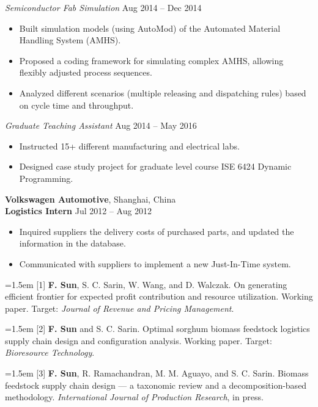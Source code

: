 \documentclass[11pt,letterpaper]{article}
\newcommand{\mhead}[1]{\leavevmode\marginpar{\small\sffamily #1}}
\begin{document}
\smallskip 
\textit{Semiconductor Fab Simulation} \hfill{{Aug 2014 -- Dec 2014}} 
\begin{itemize}
\item Built simulation models (using AutoMod) of the Automated Material Handling System (AMHS).
\item Proposed a coding framework for simulating complex AMHS, allowing flexibly adjusted process sequences.
\item Analyzed different scenarios (multiple releasing and dispatching rules) based on cycle time and throughput. 
\end{itemize}


\smallskip 
\textit{Graduate Teaching Assistant} \hfill{{Aug 2014 -- May 2016}} 
\begin{itemize}
	\item Instructed 15+ different manufacturing and electrical labs.
 	\item Designed case study project for graduate level course ISE 6424 Dynamic Programming.
\end{itemize}

\medskip
\textbf{Volkswagen Automotive}, Shanghai, China  \\
\textbf{Logistics Intern} \hfill{Jul 2012 -- Aug 2012}
\begin{itemize}
  \item Inquired suppliers the delivery costs of purchased parts, and updated the information in the database.
  \item Communicated with suppliers to implement a new Just-In-Time system.	
\end{itemize}

 
\bigskip
\mhead{Publications}%
\hangindent=1.5em [1] \textbf{F. Sun}, S. C. Sarin, W. Wang, and D. Walczak. On generating efficient frontier for expected profit contribution and resource utilization. Working paper. Target: \emph{Journal of Revenue and Pricing Management}. 

\hangindent=1.5em [2] \textbf{F. Sun} and S. C. Sarin. Optimal sorghum biomass feedstock logistics supply chain design and configuration analysis. Working paper. Target: \emph{Bioresource Technology}.

\hangindent=1.5em [3] \textbf{F. Sun}, R. Ramachandran,  M. M. Aguayo, and S. C. Sarin. Biomass feedstock supply chain design --- a taxonomic review and a decomposition-based methodology. \emph{International Journal of Production Research}, in press.
\end{document}
